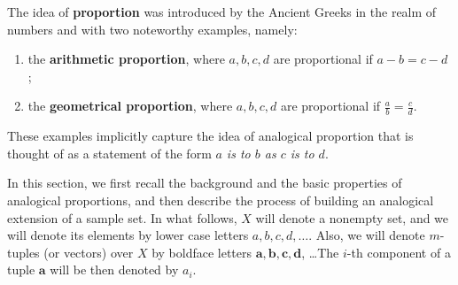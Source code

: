 \documentclass[article]{amsart}
\begin{document}
The idea of \textbf{proportion} was introduced by the Ancient Greeks in the
realm of numbers and with two noteworthy examples, namely:
\begin{enumerate}
 \item the \textbf{arithmetic proportion}, where $a,b,c,d$ are proportional
   if  $a-b=c-d$ ;
\item   the \textbf{geometrical proportion}, where $a,b,c,d$ are
  proportional  if $\frac{a}{b}=\frac{c}{d}$.
\end{enumerate}
These examples implicitly capture the idea of  analogical proportion that is
thought of as a statement of the form \textit{$a$ is to $b$ as $c$ is to $d$}.

In this section, we first recall the background and the basic properties of
analogical proportions, and then describe  the process of building an
analogical extension of a  sample set. In what follows, $X$ will denote a
nonempty set, and we will denote its elements by lower case letters $a, b, c,
d, \ldots$. Also, we will denote $m$-tuples (or vectors) over $X$ by boldface
letters $\mathbf{a}, \mathbf{b}, \mathbf{c}, \mathbf{d}$, \dots The $i$-th
component of a tuple $\mathbf{a}$ will be then denoted by $a_i$.
\end{document}
